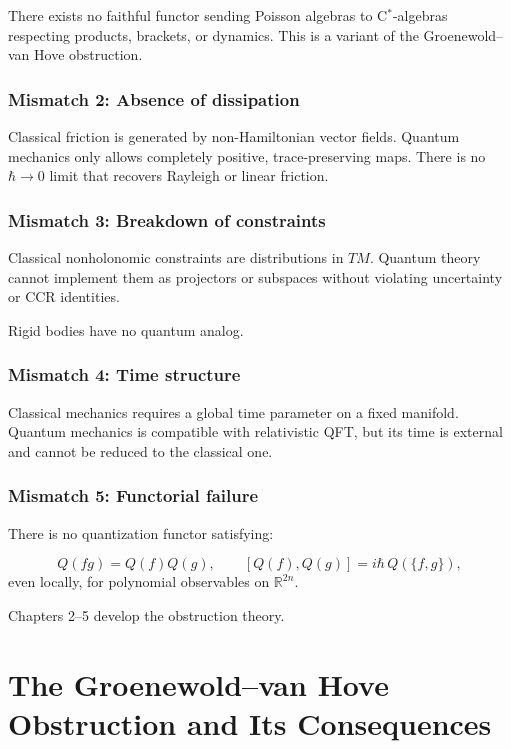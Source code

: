 \documentclass[12pt,oneside]{book}
\theoremstyle{plain}
\theoremstyle{definition}
\begin{document}
There exists no faithful functor sending Poisson algebras to C$^\ast$-algebras respecting products, brackets, or dynamics.
This is a variant of the Groenewold–van Hove obstruction.

\subsection{Mismatch 2: Absence of dissipation}

Classical friction is generated by non-Hamiltonian vector fields.
Quantum mechanics only allows completely positive, trace-preserving maps.
There is no $\hbar\to 0$ limit that recovers Rayleigh or linear friction.

\subsection{Mismatch 3: Breakdown of constraints}

Classical nonholonomic constraints are distributions in $TM$.
Quantum theory cannot implement them as projectors or subspaces
without violating uncertainty or CCR identities.

Rigid bodies have no quantum analog.

\subsection{Mismatch 4: Time structure}

Classical mechanics requires a global time parameter on a fixed manifold.
Quantum mechanics is compatible with relativistic QFT,
but its time is external and cannot be reduced to the classical one.

\subsection{Mismatch 5: Functorial failure}

There is no quantization functor satisfying:

\[
Q(fg)=Q(f)Q(g),\qquad
[Q(f),Q(g)] = i\hbar\,Q(\{f,g\}),
\]
even locally, for polynomial observables on $\mathbb{R}^{2n}$.

Chapters 2–5 develop the obstruction theory.

\chapter{The Groenewold–van Hove Obstruction and Its Consequences}
\end{document}
